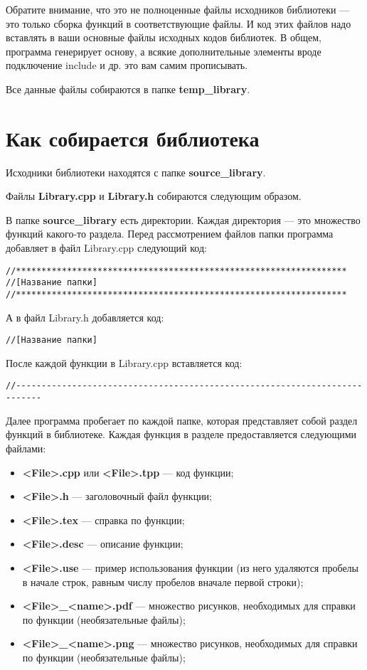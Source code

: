 \documentclass[a4paper,12pt]{article}
\begin{document}
Обратите внимание, что это не полноценные файлы исходников библиотеки --- это только сборка функций в соответствующие файлы. И код этих файлов надо вставлять в ваши основные файлы исходных кодов библиотек. В общем, программа генерирует основу, а всякие дополнительные элементы вроде подключение include и др. это вам самим прописывать.

Все данные файлы собираются в папке \textbf{temp\_library}.

\section{Как собирается библиотека}
Исходники библиотеки находятся с папке \textbf{source\_library}.

Файлы \textbf{Library.cpp} и \textbf{Library.h} собираются следующим образом.

В папке \textbf{source\_library} есть директории. Каждая директория --- это множество функций какого-то раздела. Перед рассмотрением файлов папки программа добавляет в файл Library.cpp следующий код:

\begin{lstlisting}[label=make_sectioncpp,caption=Название раздела]
//*****************************************************************
//[Название папки]
//*****************************************************************
\end{lstlisting}

А в файл Library.h добавляется код:

\begin{lstlisting}[label=make_sectionh,caption=Название раздела]
//[Название папки]
\end{lstlisting}

После каждой функции в Library.cpp вставляется код:
\begin{lstlisting}[label=make_sectionh,caption=Название раздела]
//---------------------------------------------------------------------------
\end{lstlisting}

Далее программа пробегает по каждой папке, которая представляет собой раздел функций в библиотеке. Каждая функция в разделе предоставляется следующими файлами:
\begin{itemize}
\item \textbf{<File>.cpp} или \textbf{<File>.tpp} --- код функции;
\item \textbf{<File>.h} --- заголовочный файл функции;
\item \textbf{<File>.tex} --- справка по функции;
\item \textbf{<File>.desc} --- описание функции;
\item \textbf{<File>.use} --- пример использования функции (из него удаляются пробелы в начале строк, равным числу пробелов вначале первой строки);
\item \textbf{<File>\_<name>.pdf} --- множество рисунков, необходимых для справки по функции (необязательные файлы);
\item \textbf{<File>\_<name>.png} --- множество рисунков, необходимых для справки по функции (необязательные файлы);
\end{itemize}
\end{document}
